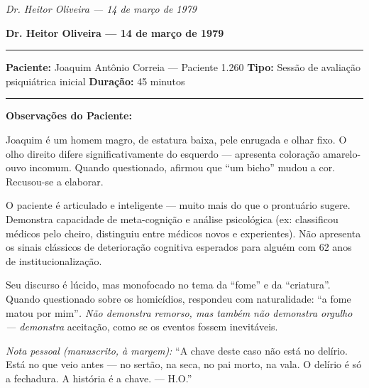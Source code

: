 
\noindent \textit{Dr. Heitor Oliveira --- 14 de março de 1979}

\noindent \textbf{Dr. Heitor Oliveira --- 14 de março de 1979}

\vspace{0.5em}\noindent\rule{\textwidth}{0.5pt}\vspace{0.5em}

\noindent \textbf{Paciente:} Joaquim Antônio Correia --- Paciente 1.260
\textbf{Tipo:} Sessão de avaliação psiquiátrica inicial
\textbf{Duração:} 45 minutos

\vspace{0.5em}\noindent\rule{\textwidth}{0.5pt}\vspace{0.5em}

\noindent \textbf{Observações do Paciente:}

\noindent Joaquim é um homem magro, de estatura baixa, pele enrugada e olhar fixo. O olho direito difere significativamente do esquerdo --- apresenta coloração amarelo-ouvo incomum. Quando questionado, afirmou que \textquotedblleft{}um bicho\textquotedblright{} mudou a cor. Recusou-se a elaborar.

\noindent O paciente é articulado e inteligente --- muito mais do que o prontuário sugere. Demonstra capacidade de meta-cognição e análise psicológica (ex: classificou médicos pelo cheiro, distinguiu entre médicos novos e experientes). Não apresenta os sinais clássicos de deterioração cognitiva esperados para alguém com 62 anos de institucionalização.

\noindent Seu discurso é lúcido, mas monofocado no tema da \textquotedblleft{}fome\textquotedblright{} e da \textquotedblleft{}criatura\textquotedblright{}. Quando questionado sobre os homicídios, respondeu com naturalidade: \textquotedblleft{}a fome matou por mim\textquotedblright{\textit{. Não demonstra remorso, mas também não demonstra orgulho --- demonstra }aceitação}, como se os eventos fossem inevitáveis.

\noindent \textit{Nota pessoal (manuscrito, à margem):} \textquotedblleft{}A chave deste caso não está no delírio. Está no que veio antes --- no sertão, na seca, no pai morto, na vala. O delírio é só a fechadura. A história é a chave. --- H.O.\textquotedblright{}

